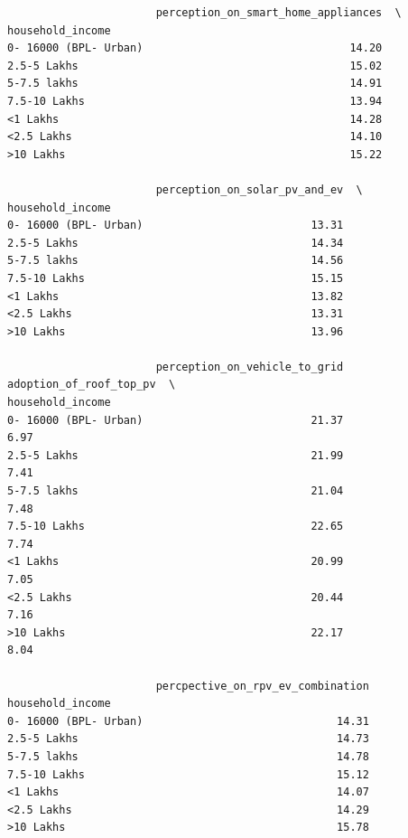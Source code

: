 \documentclass[
  letterpaper,
  DIV=11,
  numbers=noendperiod]{scrartcl}
\begin{document}
\begin{verbatim}
                       perception_on_smart_home_appliances  \
household_income                                             
0- 16000 (BPL- Urban)                                14.20   
2.5-5 Lakhs                                          15.02   
5-7.5 lakhs                                          14.91   
7.5-10 Lakhs                                         13.94   
<1 Lakhs                                             14.28   
<2.5 Lakhs                                           14.10   
>10 Lakhs                                            15.22   

                       perception_on_solar_pv_and_ev  \
household_income                                       
0- 16000 (BPL- Urban)                          13.31   
2.5-5 Lakhs                                    14.34   
5-7.5 lakhs                                    14.56   
7.5-10 Lakhs                                   15.15   
<1 Lakhs                                       13.82   
<2.5 Lakhs                                     13.31   
>10 Lakhs                                      13.96   

                       perception_on_vehicle_to_grid  adoption_of_roof_top_pv  \
household_income                                                                
0- 16000 (BPL- Urban)                          21.37                     6.97   
2.5-5 Lakhs                                    21.99                     7.41   
5-7.5 lakhs                                    21.04                     7.48   
7.5-10 Lakhs                                   22.65                     7.74   
<1 Lakhs                                       20.99                     7.05   
<2.5 Lakhs                                     20.44                     7.16   
>10 Lakhs                                      22.17                     8.04   

                       percpective_on_rpv_ev_combination  
household_income                                          
0- 16000 (BPL- Urban)                              14.31  
2.5-5 Lakhs                                        14.73  
5-7.5 lakhs                                        14.78  
7.5-10 Lakhs                                       15.12  
<1 Lakhs                                           14.07  
<2.5 Lakhs                                         14.29  
>10 Lakhs                                          15.78  
\end{verbatim}
\end{document}
